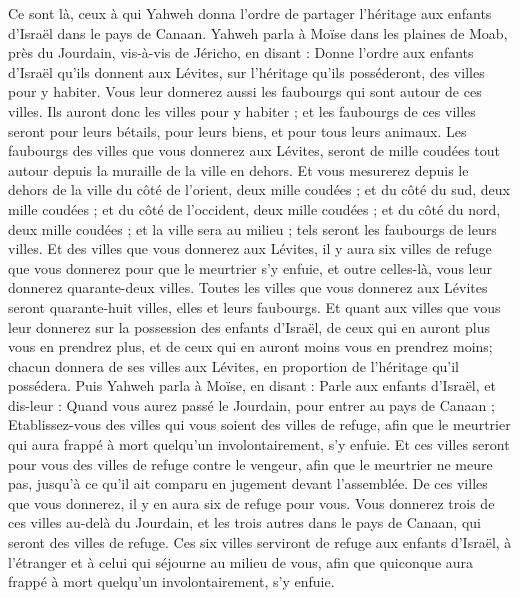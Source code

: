 \begin{multicols}{2}
Ce sont là, ceux à qui Yahweh donna l'ordre de partager l'héritage aux enfants d'Israël dans le pays de Canaan.
\VerseOne{}Yahweh parla à Moïse dans les plaines de Moab, près du Jourdain, vis-à-vis de Jéricho, en disant :
Donne l'ordre aux enfants d'Israël qu’ils donnent aux Lévites, sur l'héritage qu'ils posséderont, des villes pour y habiter. Vous leur donnerez aussi les faubourgs qui sont autour de ces villes.
Ils auront donc les villes pour y habiter ; et les faubourgs de ces villes seront pour leurs bétails, pour leurs biens, et pour tous leurs animaux.
Les faubourgs des villes que vous donnerez aux Lévites, seront de mille coudées tout autour depuis la muraille de la ville en dehors.
Et vous mesurerez depuis le dehors de la ville du côté de l'orient, deux mille coudées ; et du côté du sud, deux mille coudées ; et du côté de l'occident, deux mille coudées ; et du côté du nord, deux mille coudées ; et la ville sera au milieu ; tels seront les faubourgs de leurs villes.
Et des villes que vous donnerez aux Lévites, il y aura six villes de refuge que vous donnerez pour que le meurtrier s’y enfuie, et outre celles-là, vous leur donnerez quarante-deux villes.
Toutes les villes que vous donnerez aux Lévites seront quarante-huit villes, elles et leurs faubourgs.
Et quant aux villes que vous leur donnerez sur la possession des enfants d'Israël, de ceux qui en auront plus vous en prendrez plus, et de ceux qui en auront moins vous en prendrez moins; chacun donnera de ses villes aux Lévites, en proportion de l'héritage qu'il possédera.
Puis Yahweh parla à Moïse, en disant :
Parle aux enfants d'Israël, et dis-leur : Quand vous aurez passé le Jourdain, pour entrer au pays de Canaan ;
Etablissez-vous des villes qui vous soient des villes de refuge, afin que le meurtrier qui aura frappé à mort quelqu'un involontairement, s’y enfuie.
Et ces villes seront pour vous des villes de refuge contre le vengeur, afin que le meurtrier ne meure pas, jusqu'à ce qu'il ait comparu en jugement devant l'assemblée.
De ces villes que vous donnerez, il y en aura six de refuge pour vous.
Vous donnerez trois de ces villes au-delà du Jourdain, et les trois autres dans le pays de Canaan, qui seront des villes de refuge.
Ces six villes serviront de refuge aux enfants d'Israël, à l'étranger et à celui qui séjourne au milieu de vous, afin que quiconque aura frappé à mort quelqu'un involontairement, s’y enfuie.

\end{multicols}
